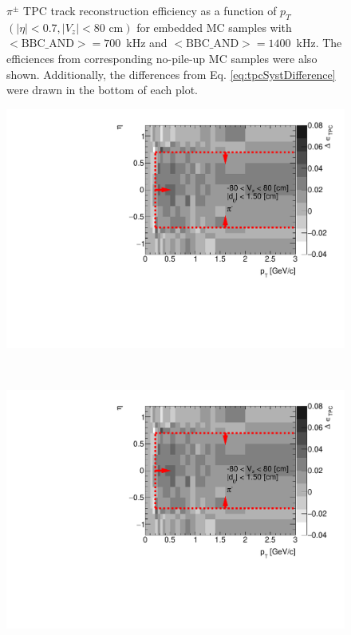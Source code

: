 \begin{figure}[hb]
{	}%
	\caption[$\pi^\pm$ TPC track reconstruction efficiency as a function of $p_T$ $\left(|\eta|<0.7, |V_z|<80\text{ cm}\right)$ for embedded MC samples with \mbox{$<\text{BBC\_AND}>=700$~kHz} and \mbox{$<\text{BBC\_AND}>=1400$~kHz}]{$\pi^\pm$ TPC track reconstruction efficiency as a function of $p_T$ $\left(|\eta|<0.7, |V_z|<80\text{ cm}\right)$ for embedded MC samples with \mbox{$<\text{BBC\_AND}>=700$~kHz} and \mbox{$<\text{BBC\_AND}>=1400$~kHz}. The efficiences from corresponding no-pile-up MC samples were also shown. Additionally, the differences  from Eq. \ref{eq:tpcSystDifference} were drawn in the bottom of each plot.}
	\label{fig:systError1Dtpc}
\end{figure}
\begin{figure}[H]
	\centering
	\parbox{0.495\textwidth}{
		\centering
		\includegraphics[width=\linewidth,page=1]{graphics/systematicsEfficiency/bbc_and/tpcEffi_d0_1_5_etapt_12D.pdf}\\
	}~
	\parbox{0.495\textwidth}{
		\centering
		\includegraphics[width=\linewidth,page=2]{graphics/systematicsEfficiency/bbc_and/tpcEffi_d0_1_5_etapt_12D.pdf}\\
}
\end{figure}
